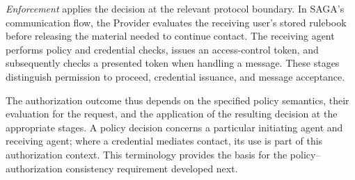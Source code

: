 \emph{Enforcement} applies the decision at the relevant protocol boundary.
In SAGA's communication flow, the Provider evaluates the receiving user's
stored rulebook before releasing the material needed to continue contact.
The receiving agent performs policy and credential checks, issues an
access-control token, and subsequently checks a presented token when handling
a message. These stages distinguish permission to proceed, credential
issuance, and message acceptance.

The authorization outcome thus depends on the specified policy semantics,
their evaluation for the request, and the application of the resulting
decision at the appropriate stages. A policy decision concerns a particular
initiating agent and receiving agent; where a credential mediates contact,
its use is part of this authorization context. This terminology provides the
basis for the policy--authorization consistency requirement developed next.
